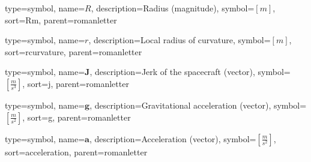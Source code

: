 {
type=symbol, %
name={\ensuremath{R}}, %
description={Radius (magnitude)}, %
symbol={$\left[m\right]$}, %
sort=Rm, %
parent=romanletter %
}

{
	type=symbol, %
	name={\ensuremath{r}}, %
	description={Local radius of curvature}, %
	symbol={$\left[m\right]$}, %
	sort=rcurvature, %
	parent=romanletter %
}

{
type=symbol, %
name={\ensuremath{\mathbf{J}}}, %
description={Jerk of the spacecraft (vector)}, %
symbol={$\left[\frac{m}{s^3}\right]$}, %
sort=j, %
parent=romanletter %
}

{
type=symbol, %
name={\ensuremath{\mathbf{g}}}, %
description={Gravitational acceleration (vector)}, %
symbol={$\left[\frac{m}{s^2}\right]$}, %
sort=g, %
parent=romanletter %
}

{
type=symbol, %
name={\ensuremath{\mathbf{a}}}, %
description={Acceleration (vector)}, %
symbol={$\left[\frac{m}{s^2}\right]$}, %
sort=acceleration, %
parent=romanletter %
}


